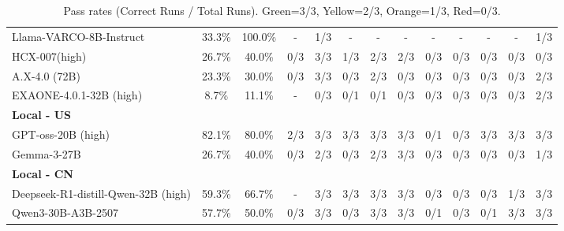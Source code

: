 \documentclass{article}
\begin{document}
\begin{table}[h!]
\begin{tabular}{l c c cccccccccc}
Llama-VARCO-8B-Instruct & 33.3\% & 100.0\% & - & \cellcolor{score1} 1/3 & - & - & - & - & - & - & - & \cellcolor{score1} 1/3 \\
HCX-007(high) & 26.7\% & 40.0\% & \cellcolor{score0} 0/3 & \cellcolor{score3} 3/3 & \cellcolor{score1} 1/3 & \cellcolor{score2} 2/3 & \cellcolor{score2} 2/3 & \cellcolor{score0} 0/3 & \cellcolor{score0} 0/3 & \cellcolor{score0} 0/3 & \cellcolor{score0} 0/3 & \cellcolor{score0} 0/3 \\
A.X-4.0 (72B) & 23.3\% & 30.0\% & \cellcolor{score0} 0/3 & \cellcolor{score3} 3/3 & \cellcolor{score0} 0/3 & \cellcolor{score2} 2/3 & \cellcolor{score0} 0/3 & \cellcolor{score0} 0/3 & \cellcolor{score0} 0/3 & \cellcolor{score0} 0/3 & \cellcolor{score0} 0/3 & \cellcolor{score2} 2/3 \\
EXAONE-4.0.1-32B (high) & 8.7\% & 11.1\% & - & \cellcolor{score0} 0/3 & \cellcolor{score0} 0/1 & \cellcolor{score0} 0/1 & \cellcolor{score0} 0/3 & \cellcolor{score0} 0/3 & \cellcolor{score0} 0/3 & \cellcolor{score0} 0/3 & \cellcolor{score0} 0/3 & \cellcolor{score2} 2/3 \\
\midrule
\multicolumn{13}{l}{\textbf{Local - US}} \\
\midrule
GPT-oss-20B (high) & 82.1\% & 80.0\% & \cellcolor{score2} 2/3 & \cellcolor{score3} 3/3 & \cellcolor{score3} 3/3 & \cellcolor{score3} 3/3 & \cellcolor{score3} 3/3 & \cellcolor{score0} 0/1 & \cellcolor{score0} 0/3 & \cellcolor{score3} 3/3 & \cellcolor{score3} 3/3 & \cellcolor{score3} 3/3 \\
Gemma-3-27B & 26.7\% & 40.0\% & \cellcolor{score0} 0/3 & \cellcolor{score2} 2/3 & \cellcolor{score0} 0/3 & \cellcolor{score2} 2/3 & \cellcolor{score3} 3/3 & \cellcolor{score0} 0/3 & \cellcolor{score0} 0/3 & \cellcolor{score0} 0/3 & \cellcolor{score0} 0/3 & \cellcolor{score1} 1/3 \\
\midrule
\multicolumn{13}{l}{\textbf{Local - CN}} \\
\midrule
Deepseek-R1-distill-Qwen-32B (high) & 59.3\% & 66.7\% & - & \cellcolor{score3} 3/3 & \cellcolor{score3} 3/3 & \cellcolor{score3} 3/3 & \cellcolor{score3} 3/3 & \cellcolor{score0} 0/3 & \cellcolor{score0} 0/3 & \cellcolor{score0} 0/3 & \cellcolor{score1} 1/3 & \cellcolor{score3} 3/3 \\
Qwen3-30B-A3B-2507 & 57.7\% & 50.0\% & \cellcolor{score0} 0/3 & \cellcolor{score3} 3/3 & \cellcolor{score0} 0/3 & \cellcolor{score3} 3/3 & \cellcolor{score3} 3/3 & \cellcolor{score0} 0/1 & \cellcolor{score0} 0/3 & \cellcolor{score0} 0/1 & \cellcolor{score3} 3/3 & \cellcolor{score3} 3/3 \\
\bottomrule
\end{tabular}
\caption{Pass rates (Correct Runs / Total Runs). Green=3/3, Yellow=2/3, Orange=1/3, Red=0/3.}
\end{table}
\end{document}
